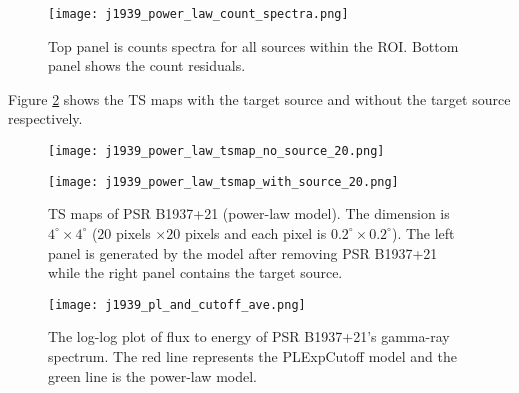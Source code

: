 \documentclass[12pt]{report}
\begin{document}
        \begin{figure}
          \centering 
          \texttt{[image: j1939\_power\_law\_count\_spectra.png]}
          \caption{Top panel is counts spectra for all sources within the ROI. Bottom panel  
            shows the count residuals. }
          \label{fig: j1939_power_law_count_spectra}
        \end{figure}

        Figure \ref{fig: j1939_power_law_tsmap_withsource_20} shows the TS maps with the 
        target source and without the target source respectively. 

        \begin{figure}[!htp]
          \begin{center}
          \begin{minipage}{0.45\textwidth}
            \begin{center} 
              \texttt{[image: j1939\_power\_law\_tsmap\_no\_source\_20.png]}
            \end{center}
          \end{minipage}
          \begin{minipage}{0.45\textwidth}
            \begin{center}
              \texttt{[image: j1939\_power\_law\_tsmap\_with\_source\_20.png]}
            \end{center}
          \end{minipage}
        \end{center}

          \caption{TS maps of PSR B1937+21 (power-law model). The dimension is $4^{\circ} \times 4^{\circ}$
            ($20$ pixels $\times 20$ pixels and each pixel is 
            $0.2^{\circ} \times 0.2^{\circ}$). The left panel is generated by the model 
            after removing PSR B1937+21 while the right panel contains the target source.}
          \label{fig: j1939_power_law_tsmap_withsource_20}
        \end{figure}

        \begin{figure}[!htp]
          \centering
          \texttt{[image: j1939\_pl\_and\_cutoff\_ave.png]}
          \caption{The log-log plot of flux to energy of PSR B1937+21’s gamma-ray spectrum.
            The red line represents the PLExpCutoff model and the green line is the power-law
            model. }
          \label{fig: j1939_pl_and_cutoff_ave}
        \end{figure}
\end{document}
